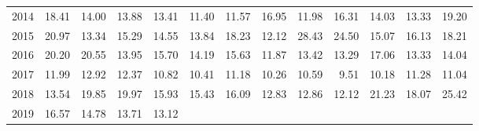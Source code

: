\begin{longtable}{rrrrrrrrrrrrr}
  2014 & 18.41 & 14.00 & 13.88 & 13.41 & 11.40 & 11.57 & 16.95 & 11.98 & 16.31 & 14.03 & 13.33 & 19.20 \\ 
  2015 & 20.97 & 13.34 & 15.29 & 14.55 & 13.84 & 18.23 & 12.12 & 28.43 & 24.50 & 15.07 & 16.13 & 18.21 \\ 
  2016 & 20.20 & 20.55 & 13.95 & 15.70 & 14.19 & 15.63 & 11.87 & 13.42 & 13.29 & 17.06 & 13.33 & 14.04 \\ 
  2017 & 11.99 & 12.92 & 12.37 & 10.82 & 10.41 & 11.18 & 10.26 & 10.59 & 9.51 & 10.18 & 11.28 & 11.04 \\ 
  2018 & 13.54 & 19.85 & 19.97 & 15.93 & 15.43 & 16.09 & 12.83 & 12.86 & 12.12 & 21.23 & 18.07 & 25.42 \\ 
  2019 & 16.57 & 14.78 & 13.71 & 13.12 &  &  &  &  &  &  &  &  \\ 
   \hline
\hline
\end{longtable}
